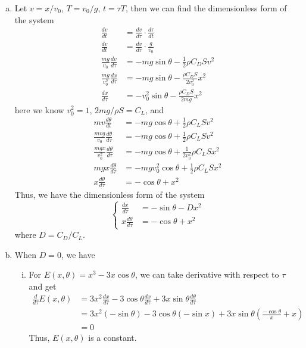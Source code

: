 \documentclass[12pt]{exam}
\begin{document}
\begin{enumerate}[(a)]
	\item Let $v=x/v_0$, $T=v_0/g$, $t=\tau T$, then we can find the dimensionless form of the system
		\begin{align*}
			\frac{dv}{dt} &= \frac{dv}{d\tau}\cdot \frac{d\tau}{dt} \\
			\frac{dv}{dt} &= \frac{dv}{d\tau}\cdot \frac{g}{v_0} \\
			\frac{mg}{v_0} \frac{dv}{d\tau} &= -mg \sin{\theta}-\frac{1}{2}\rho C_D S v^2 \\
			\frac{mg}{v_0^2} \frac{dx}{d\tau} &= -mg\sin{\theta}-\frac{\rho C_D S}{2v_0^2} x^2 \\
			\frac{dx}{d\tau} &= -v_0^2 \sin{\theta}-\frac{\rho C_D S}{2mg} x^2
		\end{align*}
		here we know $v_0^2=1$, $2mg/\rho S = C_L$, and
		\begin{align*}
			mv \frac{d\theta}{dt} &= -mg \cos{\theta}  + \frac{1}{2}\rho C_L S v^2 \\
			\frac{mvg}{v_0} \frac{d\theta}{d\tau} &= -mg \cos{\theta}  + \frac{1}{2}\rho C_L S v^2 \\
			\frac{mgx}{v_0^2} \frac{d\theta}{d\tau} &= -mg \cos{\theta}  + \frac{1}{2v_0^2}\rho C_L S x^2 \\
			mgx \frac{d\theta}{d\tau} &= -mgv_0^2 \cos{\theta}  + \frac{1}{2}\rho C_L S x^2 \\
			x\frac{d\theta}{d\tau} &= -\cos{\theta}  + x^2
		\end{align*}
	Thus, we have the dimensionless form of the system
	\[ \begin{cases} \frac{dx}{d\tau} &= -\sin{\theta}-D x^2 \\ x\frac{d\theta}{d\tau} &= -\cos{\theta}  + x^2 \end{cases} \]
	where $D=C_D/C_L$.

	\item When $D=0$, we have 
		\begin{enumerate}[(i)]
			\item For $E(x, \theta) = x^3-3x \cos \theta$, we can take derivative with respect to $\tau$ and get
				\begin{align*}
				\frac{d }{d\tau}E(x, \theta) &= 3x^2 \frac{dx}{d\tau} - 3\cos \theta \frac{dx}{d\tau} + 3x \sin \theta \frac{d\theta}{d\tau} \\
							     &= 3x^2 (-\sin{\theta}) - 3\cos \theta (-\sin x)+ 3x \sin \theta (\frac{-\cos \theta}{x}+x) \\
							     &=0
			\end{align*}
			Thus, $E(x, \theta)$ is a constant.
			\end{enumerate}


\end{enumerate}
\end{document}
